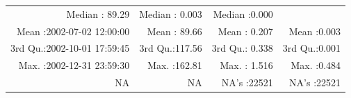 \documentclass[
  10pt,
  a4paper,oneside]{article}
\begin{document}
\begin{longtable}[]{@{}rrrr@{}}
\begin{minipage}[t]{0.19\columnwidth}
Median : 89.29\strut
\end{minipage} & \begin{minipage}[t]{0.19\columnwidth}\raggedleft
Median : 0.003\strut
\end{minipage} & \begin{minipage}[t]{0.19\columnwidth}\raggedleft
Median :0.000\strut
\end{minipage}\tabularnewline
\begin{minipage}[t]{0.33\columnwidth}\raggedleft
Mean :2002-07-02 12:00:00\strut
\end{minipage} & \begin{minipage}[t]{0.19\columnwidth}\raggedleft
Mean : 89.66\strut
\end{minipage} & \begin{minipage}[t]{0.19\columnwidth}\raggedleft
Mean : 0.207\strut
\end{minipage} & \begin{minipage}[t]{0.19\columnwidth}\raggedleft
Mean :0.003\strut
\end{minipage}\tabularnewline
\begin{minipage}[t]{0.33\columnwidth}\raggedleft
3rd Qu.:2002-10-01 17:59:45\strut
\end{minipage} & \begin{minipage}[t]{0.19\columnwidth}\raggedleft
3rd Qu.:117.56\strut
\end{minipage} & \begin{minipage}[t]{0.19\columnwidth}\raggedleft
3rd Qu.: 0.338\strut
\end{minipage} & \begin{minipage}[t]{0.19\columnwidth}\raggedleft
3rd Qu.:0.001\strut
\end{minipage}\tabularnewline
\begin{minipage}[t]{0.33\columnwidth}\raggedleft
Max. :2002-12-31 23:59:30\strut
\end{minipage} & \begin{minipage}[t]{0.19\columnwidth}\raggedleft
Max. :162.81\strut
\end{minipage} & \begin{minipage}[t]{0.19\columnwidth}\raggedleft
Max. : 1.516\strut
\end{minipage} & \begin{minipage}[t]{0.19\columnwidth}\raggedleft
Max. :0.484\strut
\end{minipage}\tabularnewline
\begin{minipage}[t]{0.33\columnwidth}\raggedleft
NA\strut
\end{minipage} & \begin{minipage}[t]{0.19\columnwidth}\raggedleft
NA\strut
\end{minipage} & \begin{minipage}[t]{0.19\columnwidth}\raggedleft
NA's :22521\strut
\end{minipage} & \begin{minipage}[t]{0.19\columnwidth}\raggedleft
NA's :22521\strut
\end{minipage}\tabularnewline
\bottomrule
\end{longtable}
\end{document}
